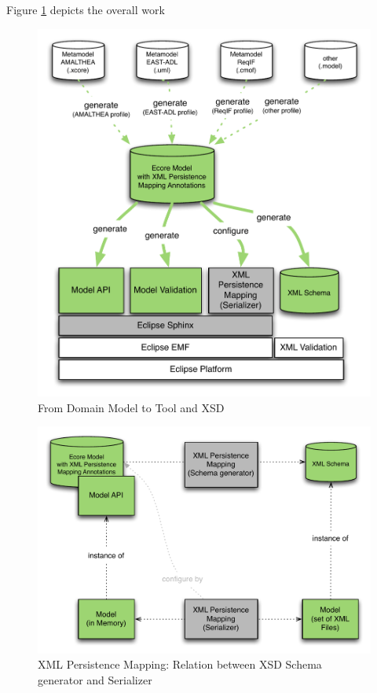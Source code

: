 \documentclass[11pt,a4paper]{article}
\begin{document}
Figure \ref{fig:XMLPersistenceMapping_Overview} depicts the overall work
\begin{figure}[hpt]
\centering
\includegraphics[width=\textwidth]{images/XMLPersistenceMapping_Overview.pdf}
\caption{From Domain Model to Tool and XSD}
\label{fig:XMLPersistenceMapping_Overview}
\end{figure}

\begin{figure}[hpt]
\centering
\includegraphics[width=\textwidth]{images/XMLPersistenceMapping_SerializerAndGenerator.pdf}
\caption{XML Persistence Mapping: Relation between XSD Schema generator and Serializer}
\label{fig:XMLPersistenceMapping_SerializerAndGenerator}
\end{figure}
\end{document}
